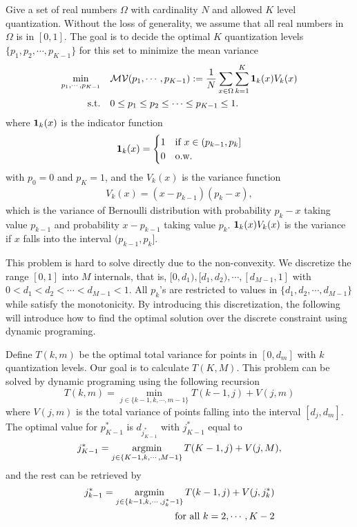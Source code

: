 Give a set of real numbers $\Omega$ with cardinality $N$ and allowed $K$ level quantization. Without the loss of generality, we assume that all real numbers in $\Omega$ is in $[0, 1]$. The goal is to decide the optimal $K$ quantization levels $\{p_1, p_2, \cdots, p_{K-1}\}$ for this set to minimize the mean variance
\begin{align}
\nonumber \min_{p_1, \cdots, p_{K-1}}\quad & \mathcal{MV}(p_1,\cdots, p_{K-1}) := {1\over N}\sum_{x\in \Omega} \sum_{k=1}^K {\bf 1}_k(x)V_k(x)\\
\text{s.t.}\quad & 0\leq p_1\leq p_2 \leq \cdots \leq p_{K-1} \leq 1.
\label{eq:opt_Q}
\end{align}
where ${\bf 1}_k(x)$ is the indicator function
\[
{\bf 1}_k(x) = 
\begin{cases}
1 & \text{if}~x\in (p_{k-1}, p_k] \\
0 & \text{o.w.}
\end{cases}
\]
with $p_0=0$ and $p_K=1$, and the $V_k(x)$ is the variance function 
\begin{align}
V_k(x) = (x-p_{k-1})(p_k - x), \label{eq:var}
\end{align}
which is the variance of Bernoulli distribution with probability $p_k-x$ taking value $p_{k-1}$ and probability $x-p_{k-1}$ taking value $p_k$. ${\bf 1}_k(x)V_k(x)$ is the variance if $x$ falls into the interval $(p_{k-1}, p_k]$. 

This problem is hard to solve directly due to the non-convexity. We discretize the range $[0,1]$ into $M$ internals, that is, $[0,d_1), [d_1, d_2), \cdots, [d_{M-1}, 1]$ with $0< d_1<d_2<\cdots < d_{M-1}<1$. All $p_k$'s are restricted to values in $\{d_1, d_2, \cdots, d_{M-1}\}$ while satisfy the monotonicity. By introducing this discretization, the following will introduce how to find the optimal solution over the discrete constraint using dynamic programing.  

Define $T(k, m)$ be the optimal total variance for points in $[0, d_m]$ with $k$ quantization levels. Our goal is to calculate $T(K, M)$. This problem can be solved by dynamic programing using the following recursion
\[
T(k, m) = \min_{j\in \{k-1, k, \cdots, m-1\}} T(k-1,j) + V(j,m)
\]
where $V(j,m)$ is the total variance of points falling into the interval $[d_j, d_m]$. The optimal value for $p_{K-1}^*$ is $ d_{j^*_{K-1}}$ with $j^*_{K-1}$ equal to
\[
j^*_{K-1} = \operatorname*{argmin}_{j\in \{K-1, k, \cdots, M-1\}} T(K-1,j) + V(j,M),
\]
and the rest can be retrieved by 
\begin{align*}
j^*_{k-1} = \operatorname*{argmin}_{j\in \{k-1, k, \cdots, j^*_k-1\}} T(k-1, j) + V(j, j^*_k) \\
\text{for all}~k=2, \cdots, K-2
\end{align*}

